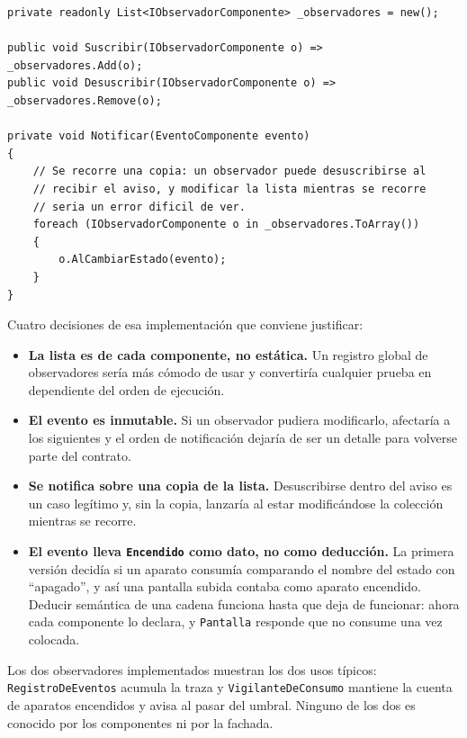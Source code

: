 {\small
\begin{verbatim}
private readonly List<IObservadorComponente> _observadores = new();

public void Suscribir(IObservadorComponente o) => _observadores.Add(o);
public void Desuscribir(IObservadorComponente o) => _observadores.Remove(o);

private void Notificar(EventoComponente evento)
{
    // Se recorre una copia: un observador puede desuscribirse al
    // recibir el aviso, y modificar la lista mientras se recorre
    // seria un error dificil de ver.
    foreach (IObservadorComponente o in _observadores.ToArray())
    {
        o.AlCambiarEstado(evento);
    }
}
\end{verbatim}
}

Cuatro decisiones de esa implementación que conviene justificar:

\begin{itemize}[leftmargin=1.2cm]
    \item \textbf{La lista es de cada componente, no estática.} Un registro global de
          observadores sería más cómodo de usar y convertiría cualquier prueba en dependiente
          del orden de ejecución.
    \item \textbf{El evento es inmutable.} Si un observador pudiera modificarlo, afectaría a
          los siguientes y el orden de notificación dejaría de ser un detalle para volverse
          parte del contrato.
    \item \textbf{Se notifica sobre una copia de la lista.} Desuscribirse dentro del aviso es
          un caso legítimo y, sin la copia, lanzaría al estar modificándose la colección
          mientras se recorre.
    \item \textbf{El evento lleva \texttt{Encendido} como dato, no como deducción.} La
          primera versión decidía si un aparato consumía comparando el nombre del estado con
          ``apagado'', y así una pantalla subida contaba como aparato encendido. Deducir
          semántica de una cadena funciona hasta que deja de funcionar: ahora cada componente
          lo declara, y \texttt{Pantalla} responde que no consume una vez colocada.
\end{itemize}

Los dos observadores implementados muestran los dos usos típicos:
\texttt{RegistroDeEventos} acumula la traza y \texttt{VigilanteDeConsumo} mantiene la cuenta
de aparatos encendidos y avisa al pasar del umbral. Ninguno de los dos es conocido por los
componentes ni por la fachada.

